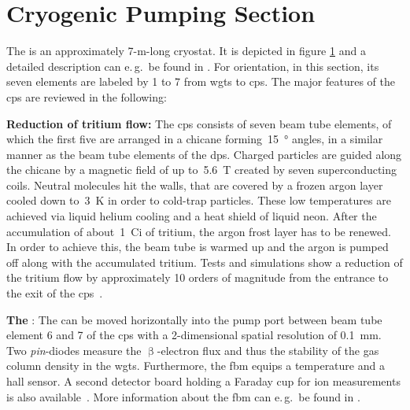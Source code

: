 \section{Cryogenic Pumping Section}
\label{sec:katrinExpSetupCryoPumpingSection}
\begin{figure}[t]
 \label{fig:katrinExpSetupCryoPumpingSection}
\end{figure}
The  is an approximately 7-m-long cryostat. It is depicted in figure \ref{fig:katrinExpSetupCryoPumpingSection} and a detailed description can e.\,g.~be found in \cite{Jansen2015}. For orientation, in this section, its seven elements are labeled by 1 to 7 from \gls{wgts} to \gls{cps}. The major features of the \gls{cps} are reviewed in the following:

{\par\textbf{Reduction of tritium flow:}
The \gls{cps} consists of seven beam tube elements, of which the first five are arranged in a chicane forming~\SI{15}{\degree} angles, in a similar manner as the beam tube elements of the \gls{dps}. Charged particles are guided along the chicane by a magnetic field of up to~\SI{5.6}{T} created by seven superconducting coils. Neutral molecules hit the walls, that are covered by a frozen argon layer cooled down to~\SI{3}{K} in order to cold-trap particles. These low temperatures are achieved via liquid helium cooling and a heat shield of liquid neon. After the accumulation of about~\SI{1}{Ci} of tritium, the argon frost layer has to be renewed. In order to achieve this, the beam tube is warmed up and the argon is pumped off along with the accumulated tritium. Tests and simulations show a reduction of the tritium flow by approximately 10 orders of magnitude from the entrance to the exit of the \gls{cps}~\cite{Jansen2015,Roettele2019}.}

{\par\textbf{The }: 
The  can be moved horizontally into the pump port between beam tube element 6 and 7 of the \gls{cps} with a 2-dimensional spatial resolution of \SI{0.1}{mm}. Two \textit{pin}-diodes measure the $\upbeta$-electron flux and thus the stability of the gas column density in the \gls{wgts}. Furthermore, the \gls{fbm} equips a temperature and a hall sensor. A second detector board holding a Faraday cup for ion measurements is also available~\cite{Klein2019}. More information about the \gls{fbm} can e.\,g.~be found in \cite{Ellinger2017,Ellinger2019}.}

